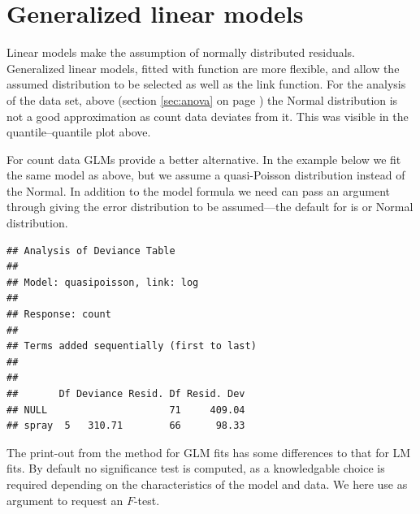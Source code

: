 \documentclass[krantz2]{krantz}\usepackage{knitr}%
\begin{document}

\section{Generalized linear models}\label{sec:stat:GLM}

Linear models make the assumption of normally distributed residuals. Generalized linear models, fitted with function  are more flexible, and allow the assumed distribution to be selected as well as the link function.
For the analysis of the  data set, above (section \ref{sec:anova} on page \pageref{sec:anova}) the Normal distribution is not a good approximation as count data deviates from it. This was visible in the quantile--quantile plot above.

For count data GLMs provide a better alternative. In the example below we fit the same model as above, but we assume a quasi-Poisson distribution instead of the Normal. In addition to the model formula we need can pass an argument through  giving the error distribution to be assumed---the default for  is  or Normal distribution.

\begin{knitrout}\footnotesize
{}\color{fgcolor}\begin{kframe}
\begin{alltt}
 \hlkwb{<-}  \hlopt{~}     
\end{alltt}
\begin{verbatim}
## Analysis of Deviance Table
## 
## Model: quasipoisson, link: log
## 
## Response: count
## 
## Terms added sequentially (first to last)
## 
## 
##       Df Deviance Resid. Df Resid. Dev
## NULL                     71     409.04
## spray  5   310.71        66      98.33
\end{verbatim}
\end{kframe}
\end{knitrout}

The print-out from the  method for GLM fits has some differences to that for LM fits. By default no significance test is computed, as a knowledgable choice is required depending on the characteristics of the model and data. We here use  as argument to request an $F$-test.
\end{document}

